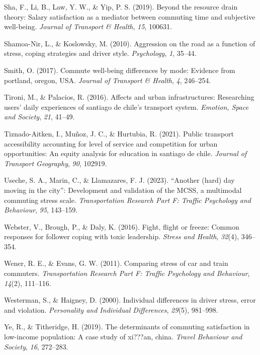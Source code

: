 \documentclass[
11pt, %
oneside, %
english, %
singlespacing, %
]{macthesis} %
\newlength{\cslhangindent}
\newenvironment{CSLReferences}[2] %
 {%
  \setlength{\parindent}{0pt}
  \ifodd #1 \everypar{\setlength{\hangindent}{\cslhangindent}}\ignorespaces\fi
  \ifnum #2 > 0
  \setlength{\parskip}{#2\baselineskip}
  \fi
 }%
 {}
\begin{document}
\begin{CSLReferences}{1}{0}
\leavevmode{}%
Sha, F., Li, B., Law, Y. W., \& Yip, P. S. (2019). Beyond the resource drain theory: Salary satisfaction as a mediator between commuting time and subjective well-being. \emph{Journal of Transport \& Health}, \emph{15}, 100631.

\leavevmode{}%
Shamoa-Nir, L., \& Koslowsky, M. (2010). Aggression on the road as a function of stress, coping strategies and driver style. \emph{Psychology}, \emph{1}, 35--44.

\leavevmode{}%
Smith, O. (2017). Commute well-being differences by mode: Evidence from portland, oregon, USA. \emph{Journal of Transport \& Health}, \emph{4}, 246--254.

\leavevmode{}%
Tironi, M., \& Palacios, R. (2016). Affects and urban infrastructures: Researching users' daily experiences of santiago de chile's transport system. \emph{Emotion, Space and Society}, \emph{21}, 41--49.

\leavevmode{}%
Tiznado-Aitken, I., Muñoz, J. C., \& Hurtubia, R. (2021). Public transport accessibility accounting for level of service and competition for urban opportunities: An equity analysis for education in santiago de chile. \emph{Journal of Transport Geography}, \emph{90}, 102919.

\leavevmode{}%
Useche, S. A., Marin, C., \& Llamazares, F. J. (2023). {``Another (hard) day moving in the city''}: Development and validation of the MCSS, a multimodal commuting stress scale. \emph{Transportation Research Part F: Traffic Psychology and Behaviour}, \emph{95}, 143--159.

\leavevmode{}%
Webster, V., Brough, P., \& Daly, K. (2016). Fight, flight or freeze: Common responses for follower coping with toxic leadership. \emph{Stress and Health}, \emph{32}(4), 346--354.

\leavevmode{}%
Wener, R. E., \& Evans, G. W. (2011). Comparing stress of car and train commuters. \emph{Transportation Research Part F: Traffic Psychology and Behaviour}, \emph{14}(2), 111--116.

\leavevmode{}%
Westerman, S., \& Haigney, D. (2000). Individual differences in driver stress, error and violation. \emph{Personality and Individual Differences}, \emph{29}(5), 981--998.

\leavevmode{}%
Ye, R., \& Titheridge, H. (2019). The determinants of commuting satisfaction in low-income population: A case study of xi???an, china. \emph{Travel Behaviour and Society}, \emph{16}, 272--283.

\end{CSLReferences}
\end{document}
